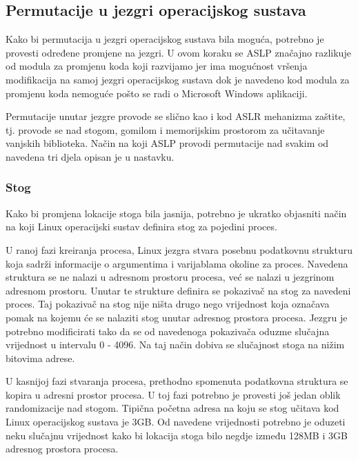 \documentclass[times, utf8, diplomski, numeric]{fer}
\begin{document}
\subsection{Permutacije u jezgri operacijskog sustava}

Kako bi permutacija u jezgri operacijskog sustava bila moguća,
potrebno je provesti određene promjene na jezgri. U ovom koraku
se ASLP značajno razlikuje od modula za promjenu koda koji
razvijamo jer ima			%
mogućnost vršenja modifikacija na samoj jezgri operacijskog
sustava dok je navedeno kod modula za promjenu koda nemoguće pošto
se radi o Microsoft Windows aplikaciji.

Permutacije unutar jezgre provode se slično kao i kod ASLR
mehanizma zaštite, tj. provode se nad stogom, gomilom i
memorijskim prostorom za učitavanje vanjskih biblioteka. Način na
koji ASLP provodi permutacije nad svakim od navedena tri djela
opisan je u nastavku.

\subsubsection{Stog}

Kako bi promjena lokacije stoga bila jasnija, potrebno je ukratko
objasniti način na koji Linux operacijski sustav definira stog za
pojedini proces. 

U ranoj fazi kreiranja procesa, Linux jezgra stvara posebnu
podatkovnu strukturu koja sadrži informacije o argumentima i
varijablama okoline za proces. Navedena struktura se ne nalazi u
adresnom prostoru procesa, već se nalazi u jezgrinom adresnom
prostoru. Unutar te strukture definira se pokazivač na stog za
navedeni proces. Taj pokazivač na stog nije ništa drugo nego
vrijednost koja označava pomak na kojemu će se nalaziti stog
unutar adresnog prostora procesa. Jezgru je potrebno modificirati
tako da se od navedenoga pokazivača oduzme slučajna
vrijednost u intervalu 0 - 4096. Na taj način dobiva se
slučajnost stoga na nižim bitovima adrese.

U kasnijoj fazi stvaranja procesa, prethodno spomenuta podatkovna
struktura se kopira u adresni prostor procesa. U toj fazi
potrebno je provesti još jedan oblik randomizacije nad stogom.
Tipična početna adresa na koju se stog učitava kod Linux
operacijskog sustava je 3GB. Od navedene vrijednosti potrebno je
oduzeti neku slučajnu vrijednost kako bi lokacija stoga bilo
negdje između 128MB i 3GB adresnog prostora procesa.
\end{document}

